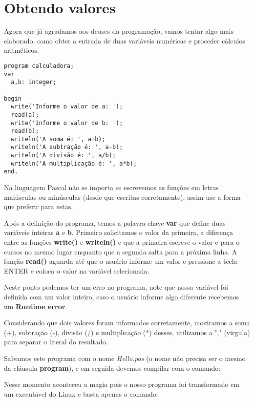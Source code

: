 \section{Obtendo valores}
Agora que já agradamos aos deuses da programação, vamos tentar algo mais elaborado, como obter a entrada de duas variáveis numéricas e proceder cálculos aritméticos.

\begin{lstlisting}[]
program calculadora;
var 
  a,b: integer;

begin
  write('Informe o valor de a: ');
  read(a);
  write('Informe o valor de b: ');
  read(b);
  writeln('A soma é: ', a+b);
  writeln('A subtração é: ', a-b);
  writeln('A divisão é: ', a/b);
  writeln('A multiplicação é: ', a*b);
end.
\end{lstlisting}

Na linguagem Pascal não se importa se escrevemos as funções em letras maiúsculas ou minúsculas (desde que escritas corretamente), assim use a forma que preferir para estas.

Após a definição do programa, temos a palavra chave \textbf{var} que define duas variáveis inteiras \textbf{a} e \textbf{b}. Primeiro solicitamos o valor da primeira, a diferença entre as funções \textbf{write()} e \textbf{writeln()} e que a primeira escreve o valor e para o cursos no mesmo lugar enquanto que a segunda salta para a próxima linha. A função \textbf{read()} aguarda até que o usuário informe um valor e pressione a tecla ENTER e coloca o valor na variável selecionada.

Neste ponto podemos ter um erro no programa, note que nossa variável foi definida com um valor inteiro, caso o usuário informe algo diferente recebemos um \textbf{Runtime error}.

Considerando que dois valores foram informados corretamente, mostramos a soma (+), subtração (-), divisão (/) e multiplicação (*) desses, utilizamos a "," (virgula) para separar o literal do resultado.

Salvamos este programa com o nome \textit{Hello.pas} (o nome não precisa ser o mesmo da cláusula \textbf{program}), e em seguida devemos compilar com o comando: \\

Nesse momento aconteceu a magia pois o nosso programa foi transformado em um executável do Linux e basta apenas o comando: \\

